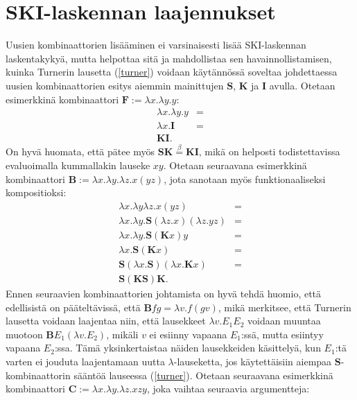 \documentclass[a4paper,12pt]{amsart}
\begin{document}
\section{SKI-laskennan laajennukset}
Uusien kombinaattorien lisääminen ei varsinaisesti lisää SKI-laskennan laskentakykyä, mutta helpottaa sitä ja mahdollistaa sen havainnollistamisen, kuinka Turnerin lausetta (\ref{turner}) voidaan käytännössä soveltaa johdettaessa uusien kombinaattorien esitys aiemmin mainittujen $\mathbf{S}$, $\mathbf{K}$ ja $\mathbf{I}$ avulla. Otetaan esimerkkinä kombinaattori $\mathbf{F}:=\lambda x.\lambda y.y$:
\begin{equation}
\begin{split}
\lambda x.\lambda y.y &= \\
\lambda x.\mathbf{I} &= \\
\mathbf{KI}.
\end{split}
\end{equation}
On hyvä huomata, että pätee myös $\mathbf{SK}\stackrel{\beta}{=}\mathbf{KI}$, mikä on helposti todistettavissa evaluoimalla kummallakin lauseke $xy$. Otetaan seuraavana esimerkkinä kombinaattori $\mathbf{B}:=\lambda x.\lambda y.\lambda z.x(yz)$, jota sanotaan myös funktionaaliseksi kompositioksi:
\begin{equation}
\begin{split}
\lambda x.\lambda y\lambda z.x(yz) &= \\
\lambda x.\lambda y.\mathbf{S}(\lambda z.x)(\lambda z.yz) &= \\
\lambda x.\lambda y.\mathbf{S}(\mathbf{K}x)y &= \\
\lambda x.\mathbf{S}(\mathbf{K}x) &= \\
\mathbf{S}(\lambda x.\mathbf{S})(\lambda x.\mathbf{K}x) &= \\
\mathbf{S(KS)K}.
\end{split}
\end{equation}
Ennen seuraavien kombinaattorien johtamista on hyvä tehdä huomio, että edellisistä on pääteltävissä, että $\mathbf{B}fg=\lambda v.f(gv)$, mikä merkitsee, että Turnerin lausetta voidaan laajentaa niin, että lausekkeet $\lambda v.E_1 E_2$ voidaan muuntaa muotoon $\mathbf{B}E_1(\lambda v.E_2)$, mikäli $v$ ei esiinny vapaana $E_1$:ssä, mutta esiintyy vapaana $E_2$:ssa. Tämä yksinkertaistaa näiden lausekkeiden käsittelyä, kun $E_1$:tä varten ei jouduta laajentamaan uutta $\lambda$-lauseketta, jos käytettäisiin aiempaa $\mathbf{S}$-kombinaattorin sääntöä lauseessa (\ref{turner}). Otetaan seuraavana esimerkkinä kombinaattori $\mathbf{C}:=\lambda x.\lambda y.\lambda z.xzy$, joka vaihtaa seuraavia argumentteja:
\end{document}

